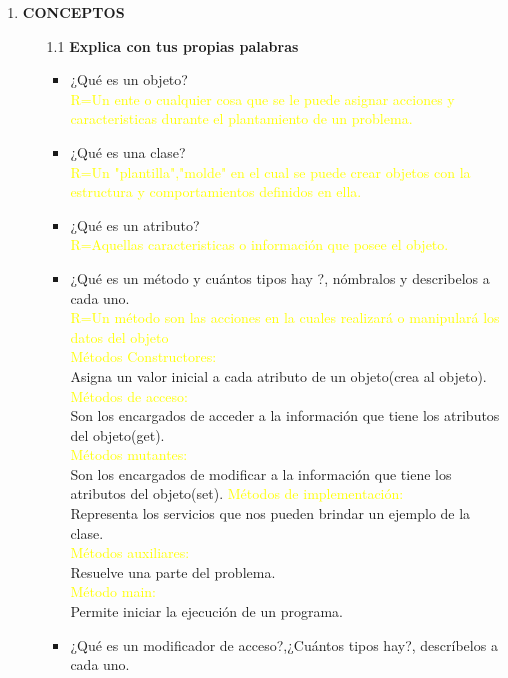 \documentclass[a4paper,10pt]{article}
\begin{document}
\begin{enumerate}
    \item \textbf{CONCEPTOS}
    \begin{enumerate}
        \item [1.1] \textbf{Explica con tus propias palabras}
        \begin{itemize}
            \item ¿Qué es un objeto?\\
            \textcolor{yellow}{R=Un ente o cualquier cosa que se le puede asignar acciones y caracteristicas durante el plantamiento de un problema.}
            \item ¿Qué es una clase?\\\textcolor{yellow}{R=Un "plantilla","molde" en el cual se puede crear objetos con la estructura y comportamientos definidos en ella.  }
            \item ¿Qué es un atributo?\\ \textcolor{yellow}{R=Aquellas caracteristicas o información que posee el objeto. }
            \item ¿Qué es un método y cuántos tipos hay ?, nómbralos y describelos a cada uno.\\ \textcolor{yellow}{R=Un método son las acciones en la cuales realizará o manipulará los datos del objeto}\\
                \textcolor{blue-green}{\textcolor{yellow}{Métodos Constructores:}\\Asigna un valor inicial a cada atributo de un objeto(crea al objeto).
                \\\textcolor{yellow}{Métodos de acceso:}\\Son los encargados de acceder a la información que tiene los atributos del objeto(get).\\\textcolor{yellow}{Métodos mutantes:}\\Son los encargados de modificar a la información que tiene los atributos del objeto(set).
                \textcolor{yellow}{Métodos de implementación:}\\ Representa los servicios que nos pueden brindar un ejemplo de la clase.\\
                \textcolor{yellow}{Métodos auxiliares:}\\Resuelve una parte del problema.\\
                \textcolor{yellow}{Método main:}\\Permite iniciar la ejecución de un programa.}
            \item ¿Qué es un modificador de acceso?,¿Cuántos tipos hay?, descríbelos a cada uno.\\

\end{itemize}
\end{enumerate}
\end{enumerate}
\end{document}
